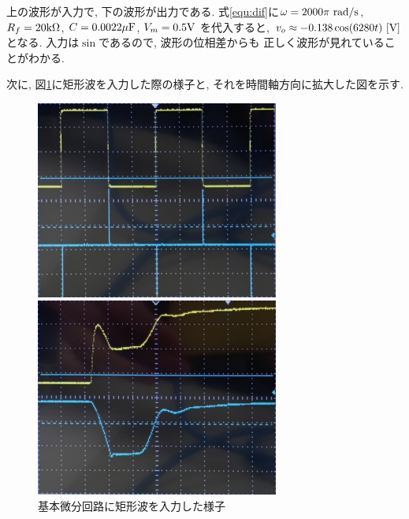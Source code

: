 \documentclass[titlepage]{jsarticle}
\begin{document}
            上の波形が入力で, 下の波形が出力である.
            式\ref{equ:dif}に$\omega = 2000\pi \ \rm{rad/s}$,
            $R_f = 20 \rm{k\Omega}$, $C = 0.0022 \rm{\mu F}$,
            $V_m = 0.5 \rm{V}$
            を代入すると, $v_o \approx -0.138 \cos(6280t) \ \rm{[V]}$となる.
            入力は$\sin$であるので, 波形の位相差からも
            正しく波形が見れていることがわかる.

            次に, 図\ref{fig:dif2}に矩形波を入力した際の様子と,
            それを時間軸方向に拡大した図を示す.

            \begin{figure}[h]
                \begin{minipage}{0.5\hsize}
                    \centering
                    \includegraphics[width=8cm]{img/dif-graph2.jpg}
                \end{minipage}
                \begin{minipage}{0.5\hsize}
                    \centering
                    \includegraphics[width=8cm]{img/dif-graph3.jpg}
                \end{minipage}
                \caption{基本微分回路に矩形波を入力した様子}
                \label{fig:dif2}
            \end{figure}
\end{document}
